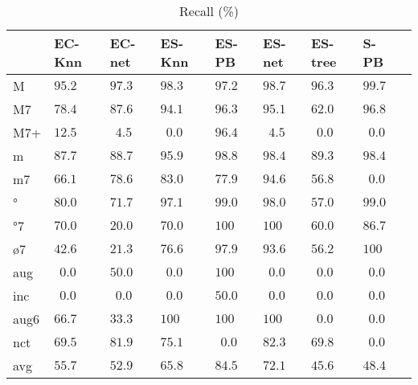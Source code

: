\documentclass{article}
\begin{document}
\begin{table}
  \centering
\begin{tabular}{l|p{0.5cm}p{0.5cm}p{0.5cm}p{0.5cm}p{0.5cm}p{0.5cm}p{0.5cm}p{0.5cm}}
       &      EC-Knn &      EC-net &      ES-Knn &       ES-PB &      ES-net &     ES-tree &        S-PB \\ \hline
   M & $  95.2$ & $  97.3$ & $  98.3$ & $  97.2$ & $  98.7$ & $  96.3$ & $  99.7$ \\
  M7 & $  78.4$ & $  87.6$ & $  94.1$ & $  96.3$ & $  95.1$ & $  62.0$ & $  96.8$ \\
 M7+ & $  12.5$ & $ ~~4.5$ & $ ~~0.0$ & $  96.4$ & $ ~~4.5$ & $ ~~0.0$ & $ ~~0.0$ \\
   m & $  87.7$ & $  88.7$ & $  95.9$ & $  98.8$ & $  98.4$ & $  89.3$ & $  98.4$ \\
  m7 & $  66.1$ & $  78.6$ & $  83.0$ & $  77.9$ & $  94.6$ & $  56.8$ & $ ~~0.0$ \\
  ° & $  80.0$ & $  71.7$ & $  97.1$ & $  99.0$ & $  98.0$ & $  57.0$ & $  99.0$ \\
 °7 & $  70.0$ & $  20.0$ & $  70.0$ & $ 100$ & $ 100$ & $  60.0$ & $  86.7$ \\
 ø7 & $  42.6$ & $  21.3$ & $  76.6$ & $  97.9$ & $  93.6$ & $  56.2$ & $ 100$ \\
 aug & $ ~~0.0$ & $  50.0$ & $ ~~0.0$ & $ 100$ & $ ~~0.0$ & $ ~~0.0$ & $ ~~0.0$ \\
 inc & $ ~~0.0$ & $ ~~0.0$ & $ ~~0.0$ & $  50.0$ & $ ~~0.0$ & $ ~~0.0$ & $ ~~0.0$ \\
aug6 & $  66.7$ & $  33.3$ & $ 100$ & $ 100$ & $ 100$ & $ ~~0.0$ & $ ~~0.0$ \\
 nct & $  69.5$ & $  81.9$ & $  75.1$ & $ ~~0.0$ & $  82.3$ & $  69.8$ & $ ~~0.0$ \\
\hline avg & $  55.7$ & $  52.9$ & $  65.8$ & $  84.5$ & $  72.1$ & $  45.6$ & $  48.4$ \\
\end{tabular}


  \caption{Recall (\%)}
  \label{tab:recall}
\end{table}
\end{document}

